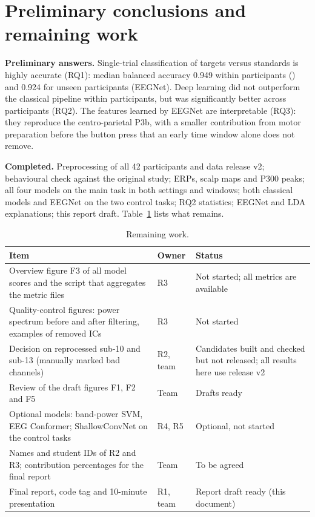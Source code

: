\section{Preliminary conclusions and remaining work}
\label{ch:conclusion}

\textbf{Preliminary answers.} Single-trial classification of targets versus standards is highly accurate (RQ1): median balanced accuracy 0.949 within participants () and 0.924 for unseen participants (EEGNet). Deep learning did not outperform the classical pipeline within participants, but was significantly better across participants (RQ2). The features learned by EEGNet are interpretable (RQ3): they reproduce the centro-parietal P3b, with a smaller contribution from motor preparation before the button press that an early time window alone does not remove.

\textbf{Completed.} Preprocessing of all 42 participants and data release v2; behavioural check against the original study; ERPs, scalp maps and P300 peaks; all four models on the main task in both settings and windows; both classical models and EEGNet on the two control tasks; RQ2 statistics; EEGNet and LDA explanations; this report draft. Table~\ref{tab:remaining} lists what remains.

\begin{table}[H]
\centering
\small
\caption{Remaining work.}
\label{tab:remaining}
\begin{tabularx}{\linewidth}{>{\raggedright\arraybackslash}X>{\raggedright\arraybackslash}p{1.8cm}>{\raggedright\arraybackslash}p{5.2cm}}
\toprule
\textbf{Item} & \textbf{Owner} & \textbf{Status} \\
\midrule
Overview figure F3 of all model scores and the script that aggregates the metric files & R3 & Not started; all metrics are available \\
Quality-control figures: power spectrum before and after filtering, examples of removed ICs & R3 & Not started \\
Decision on reprocessed sub-10 and sub-13 (manually marked bad channels) & R2, team & Candidates built and checked but not released; all results here use release v2 \\
Review of the draft figures F1, F2 and F5 & Team & Drafts ready \\
Optional models: band-power SVM, EEG Conformer; ShallowConvNet on the control tasks & R4, R5 & Optional, not started \\
Names and student IDs of R2 and R3; contribution percentages for the final report & Team & To be agreed \\
Final report, code tag and 10-minute presentation & R1, team & Report draft ready (this document) \\
\bottomrule
\end{tabularx}
\end{table}

